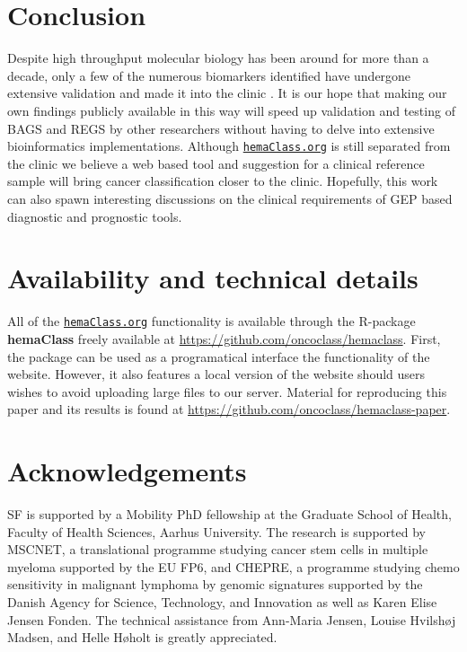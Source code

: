 \documentclass{article}
\newcommand{\hemaClass}{\href{http://hemaClass.org}{\texttt{hemaClass.org}}}
\newcommand{\R}{\textsf{R}}
\begin{document}
\section{Conclusion}
Despite high throughput molecular biology has been around for more than a decade, only a few of the numerous biomarkers identified have undergone extensive validation and made it into the clinic \citep{Chen2012a}.
It is our hope that making our own findings publicly available in this way will speed up validation and testing of BAGS and REGS by other researchers without having to delve into extensive bioinformatics implementations.
Although \hemaClass{} is still separated from the clinic we believe a web based tool and suggestion for a clinical reference sample will bring cancer classification closer to the clinic.
Hopefully, this work can also spawn interesting discussions on the clinical requirements of GEP based diagnostic and prognostic tools.

{}
\section*{Availability and technical details}
All of the \hemaClass{} functionality is available through the \R{}-package \textbf{hemaClass} freely available at
\url{https://github.com/oncoclass/hemaclass}.
First, the package can be used as a programatical interface the functionality of the website.
However, it also features a local version of the website should users wishes to avoid uploading large files to our server.
Material for reproducing this paper and its results is found at \url{https://github.com/oncoclass/hemaclass-paper}.

{}
\section*{Acknowledgements}
SF is supported by a Mobility PhD fellowship at the Graduate School of Health, Faculty of Health Sciences, Aarhus University.
The research is supported by MSCNET, a translational programme studying cancer stem cells in multiple myeloma supported by the EU FP6, and CHEPRE, a programme studying chemo sensitivity in malignant lymphoma by genomic signatures supported by the Danish Agency for Science, Technology, and Innovation as well as Karen Elise Jensen Fonden.
The technical assistance from Ann-Maria Jensen, Louise Hvilsh{\o}j Madsen, and Helle H{\o}holt is greatly appreciated.
\end{document}
